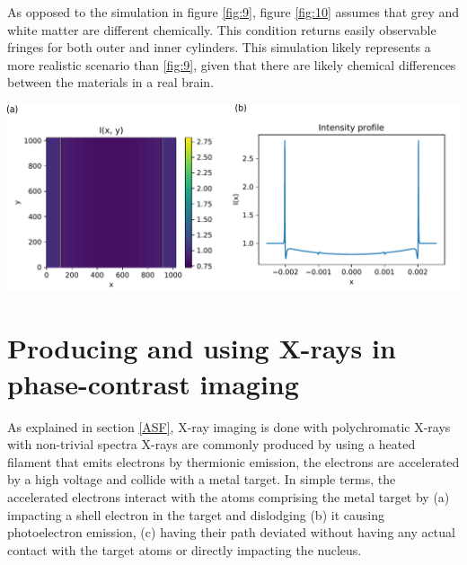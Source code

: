 \documentclass[10pt, a4paper, singlespacing]{report}
\newenvironment{Figure}
    {\par\medskip\noindent\minipage{\linewidth}}
    {\endminipage\par\medskip}
\begin{document}
As opposed to the simulation in figure \ref{fig:9}, figure \ref{fig:10} assumes that grey and white matter are different chemically. This condition returns  easily observable fringes for both outer and inner cylinders. This simulation likely represents a more realistic scenario than \ref{fig:9}, given that there are likely chemical differences between the materials in a real brain.
\begin{Figure}
\centering
\includegraphics[width=\linewidth]{optimistic_case.pdf}
\label{fig:10}
\end{Figure}


\chapter{Producing and using X-rays in phase-contrast imaging}\label{using XRAYS}

As explained in section \ref{ASF}, X-ray imaging is done with polychromatic X-rays with non-trivial spectra\cite{CH49}
X-rays are commonly produced by using a heated filament that emits electrons by thermionic emission, the electrons are accelerated by a high voltage and collide with a metal target. In simple terms, the accelerated electrons interact with the atoms comprising the metal target by (a) impacting a shell electron in the target and dislodging (b) it causing photoelectron emission, (c) having their path deviated without having any actual contact with the target atoms or directly impacting the nucleus.
\end{document}
